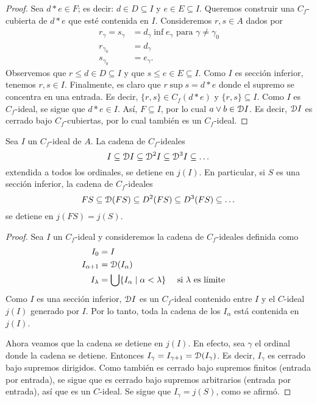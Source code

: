 \begin{proof}
  Sea $d*e\in F$; es decir: $d\in D\subseteq I$ y $e\in E\subseteq I$.
  Queremos construir una $C_f$-cubierta de $d*e$ que esté contenida
  en $I$.
  Consideremos  $r,s\in A$ dados por
  \begin{align*}
    r_\gamma = s_\gamma
      &= d_\gamma \inf e_\gamma \text{ para } \gamma\neq\gamma_0 \\
    r_{\gamma_0} &= d_\gamma \\
    s_{\gamma_0} &= e_\gamma.
  \end{align*}
  Observemos que $r\leq d\in D\subseteq I$ y que $s\leq e\in
  E\subseteq I$.
  Como $I$ es sección inferior, tenemos $r,s\in I$.
  Finalmente, es claro que $r\sup s = d*e$ donde el supremo se
  concentra en una entrada.
  Es decir, $\{r,s\}\in C_f(d*e)$ y $\{r,s\}\subseteq I$.
  Como $I$ es $C_f$-ideal, se sigue que $d*e\in I$.
  Así, $F\subseteq I$, por lo cual $a\sup b\in\D I$.
  Es decir, $\D I$ es cerrado bajo $C_f$-cubiertas, por lo cual
  también es un $C_f$-ideal.
\end{proof}

\begin{lemma}[Saltar de $\D(FS)$ a $j(S)$]
  Sea $I$ un $C_f$-ideal de $A$.
  La cadena de $C_f$-ideales
  \[
      I\subseteq \D I
      \subseteq \D^{2} I
      \subseteq \D^{3} I
      \subseteq \dots
  \]
  extendida a todos los ordinales, se detiene en $j(I)$.
  En particular, si $S$ es una sección inferior, la cadena de
  $C_f$-ideales
    \[
        FS
        \subseteq \cal D(FS)
        \subseteq D^2(FS)
        \subseteq D^3(FS)
        \subseteq \dots
    \]
  se detiene en $j(FS)=j(S)$.
\end{lemma}
\begin{proof}
    Sea $I$ un $C_f$-ideal y consideremos la cadena de $C_f$-ideales
    definida como
    \begin{align*}
        I_0 &= I \\
        I_{\alpha+1} &= \D(I_\alpha) \\
        I_\lambda
        &= \bigcup\{I_\alpha \mid \alpha<\lambda\}
            && \text{ si $\lambda$ es límite }
    \end{align*}
    Como $I$ es una sección inferior, $\D I$ es un $C_f$-ideal
    contenido entre $I$ y el $C$-ideal $j(I)$ generado por $I$.
    Por lo tanto, toda la cadena de los $I_\alpha$ está contenida en
    $j(I)$.

    Ahora veamos que la cadena se detiene en $j(I)$.
    En efecto, sea $\gamma$ el ordinal donde la cadena
    se detiene.
    Entonces $I_\gamma=I_{\gamma+1}=\D(I_\gamma)$.
    Es decir, $I_\gamma$ es cerrado bajo supremos dirigidos.
    Como también es cerrado bajo supremos finitos
    (entrada por entrada), se sigue
    que es cerrado bajo supremos arbitrarios
    (entrada por entrada), así que es
    un $C$-ideal.
    Se sigue que $I_\gamma=j(S)$, como se afirmó.
\end{proof}

